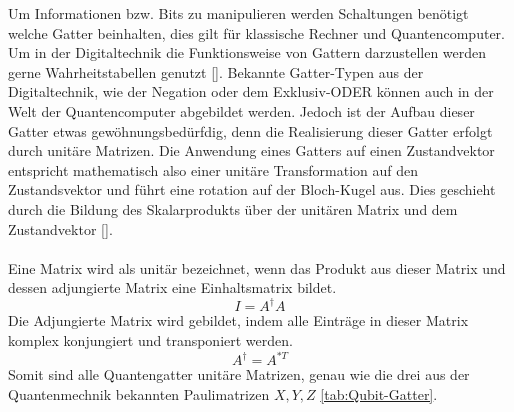 Um Informationen bzw. Bits zu manipulieren werden Schaltungen ben\"otigt welche Gatter beinhalten, dies gilt f\"ur klassische Rechner und Quantencomputer. Um in der Digitaltechnik die Funktionsweise von Gattern darzustellen werden gerne Wahrheitstabellen genutzt \ref{}. Bekannte Gatter-Typen aus der Digitaltechnik, wie der Negation oder dem Exklusiv-ODER k\"onnen auch in der Welt der Quantencomputer abgebildet werden. Jedoch ist der Aufbau dieser Gatter etwas gew\"ohnungsbed\"urfdig, denn die Realisierung dieser Gatter erfolgt durch unit\"are Matrizen. Die Anwendung eines Gatters auf einen Zustandvektor entspricht mathematisch also einer unit\"are Transformation auf den Zustandsvektor und f\"uhrt eine rotation auf der Bloch-Kugel aus. Dies geschieht durch die Bildung des Skalarprodukts \"uber der unit\"aren Matrix und dem Zustandvektor \ref{}. \\ \\
Eine Matrix wird als unit\"ar bezeichnet, wenn das Produkt aus dieser Matrix und dessen adjungierte Matrix eine Einhaltsmatrix bildet.
\begin{equation}
  I = A^{\dagger} A
\end{equation}
Die Adjungierte Matrix wird gebildet, indem alle Eintr\"age in dieser Matrix komplex konjungiert und transponiert werden.
\begin{equation}
  A^{\dagger} = A^{*T}
\end{equation}
Somit sind alle Quantengatter unit\"are Matrizen, genau wie die drei aus der Quantenmechnik bekannten Paulimatrizen $X, Y, Z$ \ref{tab:Qubit-Gatter}.


